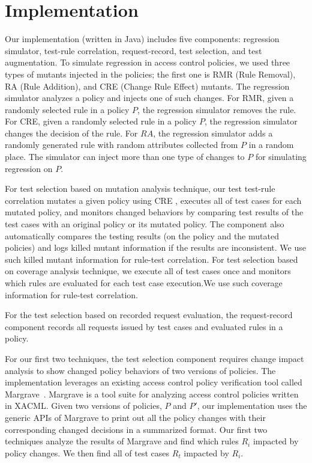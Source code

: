 \section{Implementation} \label{sec:implementation}

Our implementation (written in Java) includes five components: regression simulator, test-rule correlation, request-record, test selection,
and test augmentation. To simulate regression in access control policies, 
we used three types of mutants injected in the policies; the first one
is RMR (Rule Removal), RA (Rule Addition), and CRE (Change Rule Effect)
mutants. The regression simulator analyzes a policy and injects one
of such changes. For RMR, given a randomly selected rule in a policy $P$,
the regression simulator removes the rule. For CRE,
given a randomly selected rule in a policy $P$, the regression simulator changes
the decision of the rule.
For $RA$, the regression simulator adds a randomly generated
rule with random attributes collected from $P$ in a random place.
The simulator can inject more than one type of changes to $P$ for simulating
regression on $P$.

For test selection based on mutation analysis technique,
our test test-rule correlation mutates a given policy using CRE
, executes all of test cases for each mutated policy, and monitors changed
behaviors by comparing test results of the test cases with an original policy or its mutated policy.
The component also automatically compares the testing results (on the policy and the mutated
policies) and logs killed mutant information if the results are inconsistent. We use
such killed mutant information for rule-test correlation.
For test selection based on coverage analysis technique,
we execute  all of test cases once and monitors
which rules are evaluated for each test case execution.We use such
coverage information for rule-test correlation.

For the test selection based on recorded request evaluation,
the request-record component records all requests issued by test cases and evaluated rules in a policy.

For our first two techniques, the test selection component requires change impact analysis to
show changed policy behaviors of two versions of policies.
The implementation leverages an existing access control policy verification tool called Margrave~\cite{fisler05:verification}. Margrave is a tool suite for analyzing access control policies written in XACML.
Given two versions of policies, $P$ and $P'$, 
our implementation uses the generic APIs of Margrave to
print out all the policy changes with their corresponding changed decisions in a summarized format.
Our first two techniques analyze the results of Margrave and
find which rules $R_i$ impacted by policy changes. We then find all of test cases $R_t$
impacted by $R_i$.

